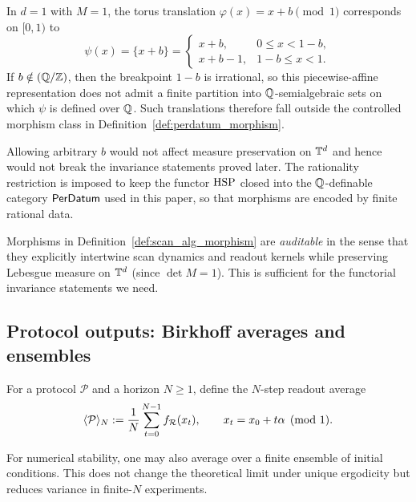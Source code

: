 \begin{example}
In $d=1$ with $M=1$, the torus translation $\varphi(x)=x+b\pmod{1}$ corresponds on $[0,1)$ to
\[
\psi(x)=\{x+b\}=
\begin{cases}
x+b,& 0\le x<1-b,\\
x+b-1,& 1-b\le x<1.
\end{cases}
\]
If $b\notin(\mathbb{Q}/\mathbb{Z})$, then the breakpoint $1-b$ is irrational, so this piecewise-affine representation does not admit a finite partition into $\mathbb{Q}$-semialgebraic sets on which $\psi$ is defined over $\mathbb{Q}$. Such translations therefore fall outside the controlled morphism class in Definition~\ref{def:perdatum_morphism}.
\end{example}

\begin{remark}
Allowing arbitrary $b$ would not affect measure preservation on $\mathbb{T}^d$ and hence would not break the invariance statements proved later. The rationality restriction is imposed to keep the functor $\mathrm{HSP}$ closed into the $\mathbb{Q}$-definable category $\mathsf{PerDatum}$ used in this paper, so that morphisms are encoded by finite rational data.
\end{remark}

Morphisms in Definition~\ref{def:scan_alg_morphism} are \emph{auditable} in the sense that they explicitly intertwine scan dynamics and readout kernels while preserving Lebesgue measure on $\mathbb{T}^d$ (since $\det M=1$). This is sufficient for the functorial invariance statements we need.

\subsection{Protocol outputs: Birkhoff averages and ensembles}
\label{sec:protocol_outputs}

\begin{definition}
\label{def:birkhoff_average}
For a protocol $\mathcal{P}$ and a horizon $N\ge 1$, define the $N$-step readout average
\begin{equation}
\label{eq:birkhoff_average}
\langle \mathcal{P} \rangle_N
:= \frac{1}{N}\sum_{t=0}^{N-1} f_{\mathcal{R}}(x_t),
\qquad x_t=x_0+t\alpha\pmod{1}.
\end{equation}
\end{definition}

For numerical stability, one may also average over a finite ensemble of initial conditions. This does not change the theoretical limit under unique ergodicity but reduces variance in finite-$N$ experiments.


